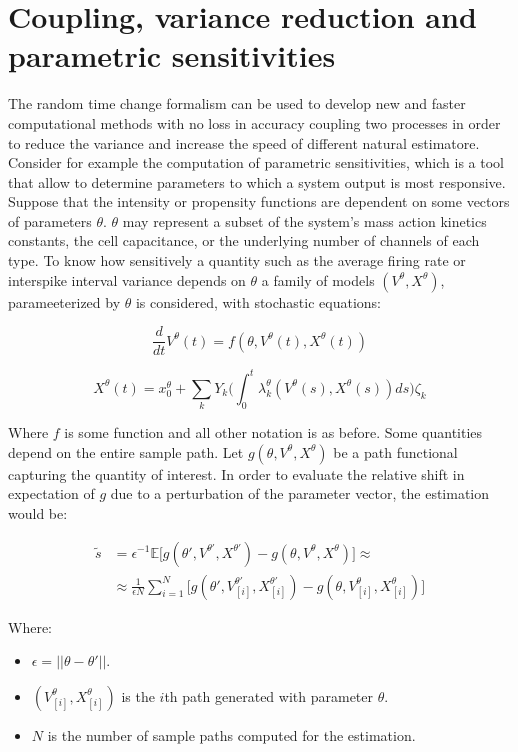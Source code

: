 \section{Coupling, variance reduction and parametric sensitivities}
The random time change formalism can be used to develop new and faster computational methods with no loss in accuracy coupling two processes in order to reduce the variance and increase the speed of different natural estimatore.
Consider for example the computation of parametric sensitivities, which is a tool that allow to determine parameters to which a system output is most responsive.
Suppose that the intensity or propensity functions are dependent on some vectors of parameters $\theta$.
$\theta$ may represent a subset of the system's mass action kinetics constants, the cell capacitance, or the underlying number of channels of each type.
To know how sensitively a quantity such as the average firing rate or interspike interval variance depends on $\theta$ a family of models $(V^\theta, X^\theta)$, parameeterized by $\theta$ is considered, with stochastic equations:

$$\frac{d}{dt}V^\theta(t) = f(\theta, V^\theta(t), X^\theta(t))$$

$$X^\theta(t) = x_0^\theta + \sum\limits_kY_k\biggl(\int_0^t\lambda_k^\theta(V^\theta(s), X^\theta(s))ds\biggr)\zeta_k$$

Where $f$ is some function and all other notation is as before.
Some quantities depend on the entire sample path.
Let $g(\theta, V^\theta, X^\theta)$ be a path functional capturing the quantity of interest.
In order to evaluate the relative shift in expectation of $g$ due to a perturbation of the parameter vector, the estimation would be:

\begin{align*}
	\tilde{s} &=\epsilon^{-1}\mathbb{E}\bigl[g(\theta', V^{\theta'}, X^{\theta'})-g(\theta, V^\theta, X^\theta)\bigr]\approx\\
						&\approx\frac{1}{\epsilon N}\sum\limits_{i=1}^N\bigl[g(\theta', V_{[i]}^{\theta'}, X_{[i]}^{\theta'})-g(\theta, V_{[i]}^\theta, X_{[i]}^\theta)\bigr]
\end{align*}

Where:

\begin{itemize}
	\item $\epsilon= ||\theta-\theta'||$.
	\item $(V_{[i]}^\theta, X_{[i]}^{\theta})$ is the $i$th path generated with parameter $\theta$.
	\item $N$ is the number of sample paths computed for the estimation.
\end{itemize}

